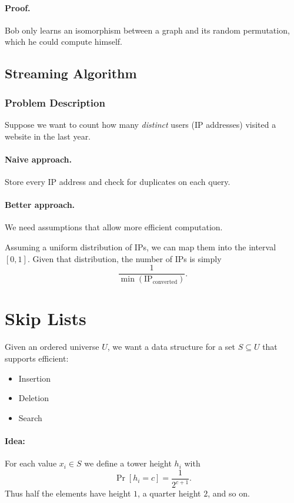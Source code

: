\documentclass{article}
\begin{document}
\paragraph{Proof.}
Bob only learns an isomorphism between a graph and its random permutation, which he could compute himself.

\subsection{Streaming Algorithm}

\subsubsection{Problem Description}

Suppose we want to count how many \emph{distinct} users (IP addresses) visited a website in the last year.

\paragraph{Naive approach.}
Store every IP address and check for duplicates on each query.

\paragraph{Better approach.}
We need assumptions that allow more efficient computation.

Assuming a uniform distribution of IPs, we can map them into the interval $[0,1]$.  
Given that distribution, the number of IPs is simply
\[
\frac{1}{\min(\text{IP}_{\text{converted}})}.
\]

\section{Skip Lists}
Given an ordered universe $U$, we want a data structure for a set $S \subseteq U$ that supports efficient:
\begin{itemize}
    \item Insertion
    \item Deletion
    \item Search
\end{itemize}

\paragraph{Idea:}  
For each value $x_i \in S$ we define a tower height $h_i$ with
\[
\Pr[h_i = c] = \frac{1}{2^{c+1}}.
\]
Thus half the elements have height $1$, a quarter height $2$, and so on.
\end{document}
